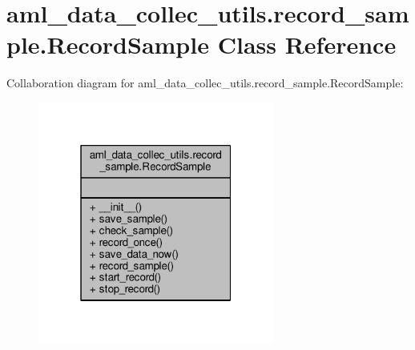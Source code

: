 \hypertarget{classaml__data__collec__utils_1_1record__sample_1_1_record_sample}{\section{aml\-\_\-data\-\_\-collec\-\_\-utils.\-record\-\_\-sample.\-Record\-Sample Class Reference}
\label{classaml__data__collec__utils_1_1record__sample_1_1_record_sample}
}


Collaboration diagram for aml\-\_\-data\-\_\-collec\-\_\-utils.\-record\-\_\-sample.\-Record\-Sample\-:\nopagebreak
\begin{figure}[H]
\begin{center}
\leavevmode
\includegraphics[width=220pt]{classaml__data__collec__utils_1_1record__sample_1_1_record_sample__coll__graph}
\end{center}
\end{figure}
